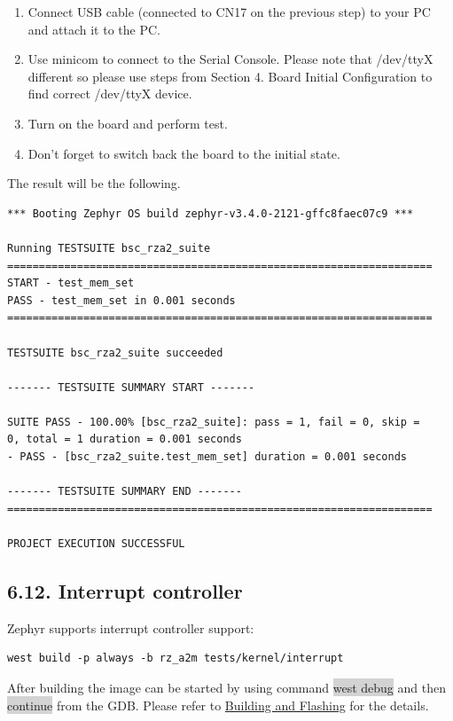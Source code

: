 \documentclass[11pt,a4paper,oneside]{article}
\begin{document}
\begin{enumerate}
\def\labelenumi{\arabic{enumi})}
\setcounter{enumi}{3}
\item
  Connect USB cable (connected to CN17 on the previous step) to your PC
  and attach it to the PC.
\item
  Use minicom to connect to the Serial Console. Please note that
  /dev/ttyX different so please use steps from Section 4. Board Initial
  Configuration to find correct /dev/ttyX device.
\item
  Turn on the board and perform test.
\item
  Don't forget to switch back the board to the initial state.
\end{enumerate}

The result will be the following.

\begin{lstlisting}
*** Booting Zephyr OS build zephyr-v3.4.0-2121-gffc8faec07c9 ***

Running TESTSUITE bsc_rza2_suite
===================================================================
START - test_mem_set
PASS - test_mem_set in 0.001 seconds
===================================================================

TESTSUITE bsc_rza2_suite succeeded

------- TESTSUITE SUMMARY START -------

SUITE PASS - 100.00% [bsc_rza2_suite]: pass = 1, fail = 0, skip =
0, total = 1 duration = 0.001 seconds
- PASS - [bsc_rza2_suite.test_mem_set] duration = 0.001 seconds

------- TESTSUITE SUMMARY END -------
===================================================================

PROJECT EXECUTION SUCCESSFUL
\end{lstlisting}

\subsection*{6.12. Interrupt controller}\label{interrupt-controller}

Zephyr supports interrupt controller support:

\begin{lstlisting}
west build -p always -b rz_a2m tests/kernel/interrupt
\end{lstlisting}

After building the image can be started by using command \colorbox{lightgray}{west debug}
and then \colorbox{lightgray}{continue} from the GDB. Please refer to
\hyperref[building-and-flashing]{Building and Flashing} for the
details.
\end{document}
